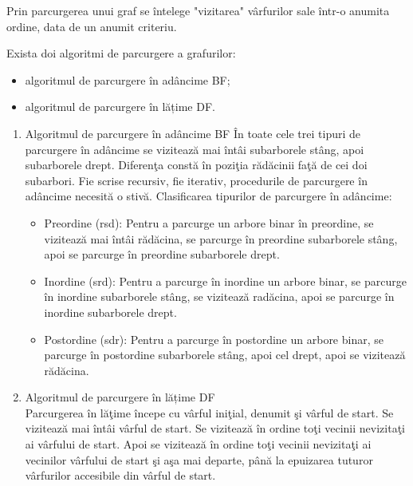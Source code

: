 \documentclass{report}
\begin{document}
Prin parcurgerea unui graf se întelege "vizitarea" vârfurilor sale într-o anumita ordine, data de un anumit criteriu.

Exista doi algoritmi de parcurgere  a grafurilor:
\begin{itemize}
\item algoritmul de parcurgere în adâncime BF;
\item algoritmul de parcurgere în lățime DF.
\end{itemize}
\begin{enumerate}
\item    Algoritmul de parcurgere în adâncime BF \newline
În toate cele trei tipuri de parcurgere în adâncime se vizitează mai întâi subarborele stâng, apoi subarborele drept. Diferenţa constă în poziţia rădăcinii faţă de cei doi subarbori. Fie scrise recursiv, fie iterativ, procedurile de parcurgere în adâncime necesită o stivă.
              Clasificarea tipurilor de parcurgere în adâncime:
              \begin{itemize}
             \item Preordine (rsd):
             Pentru a parcurge un arbore binar în preordine, se vizitează mai întâi rădăcina, se parcurge în preordine subarborele stâng, apoi se parcurge în preordine subarborele drept.
            \item Inordine (srd):
            Pentru a parcurge în inordine un arbore binar, se parcurge în inordine subarborele stâng, se vizitează radăcina, apoi se parcurge în inordine subarborele drept.

            \item Postordine (sdr):
            Pentru a parcurge în postordine un arbore binar, se parcurge în postordine subarborele stâng, apoi cel drept, apoi se vizitează rădăcina.

\end{itemize}
\item Algoritmul de parcurgere în lățime DF \\
 Parcurgerea în lăţime începe cu vârful iniţial, denumit şi vârful de start. Se vizitează mai întâi vârful de start. Se vizitează în ordine toţi vecinii nevizitaţi ai vârfului de start.  Apoi se vizitează în ordine toţi vecinii nevizitaţi ai vecinilor vârfului de start şi aşa mai departe, până la epuizarea tuturor vârfurilor accesibile din vârful de start.
\end{enumerate}
\end{document}
